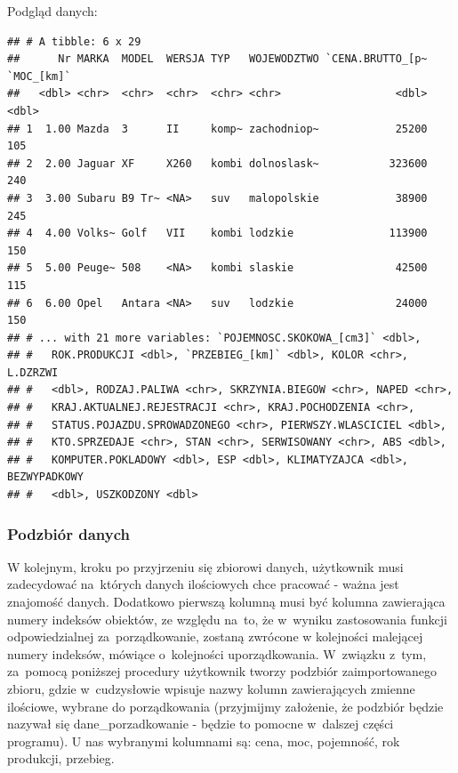 \documentclass[12pt,a4paper]{report}
\begin{document}
{Podgląd danych:

\begin{Shaded}
\begin{Highlighting}[]
\end{Highlighting}
\end{Shaded}

\begin{verbatim}
## # A tibble: 6 x 29
##      Nr MARKA  MODEL  WERSJA TYP   WOJEWODZTWO `CENA.BRUTTO_[p~ `MOC_[km]`
##   <dbl> <chr>  <chr>  <chr>  <chr> <chr>                  <dbl>      <dbl>
## 1  1.00 Mazda  3      II     komp~ zachodniop~            25200        105
## 2  2.00 Jaguar XF     X260   kombi dolnoslask~           323600        240
## 3  3.00 Subaru B9 Tr~ <NA>   suv   malopolskie            38900        245
## 4  4.00 Volks~ Golf   VII    kombi lodzkie               113900        150
## 5  5.00 Peuge~ 508    <NA>   kombi slaskie                42500        115
## 6  6.00 Opel   Antara <NA>   suv   lodzkie                24000        150
## # ... with 21 more variables: `POJEMNOSC.SKOKOWA_[cm3]` <dbl>,
## #   ROK.PRODUKCJI <dbl>, `PRZEBIEG_[km]` <dbl>, KOLOR <chr>, L.DZRZWI
## #   <dbl>, RODZAJ.PALIWA <chr>, SKRZYNIA.BIEGOW <chr>, NAPED <chr>,
## #   KRAJ.AKTUALNEJ.REJESTRACJI <chr>, KRAJ.POCHODZENIA <chr>,
## #   STATUS.POJAZDU.SPROWADZONEGO <chr>, PIERWSZY.WLASCICIEL <dbl>,
## #   KTO.SPRZEDAJE <chr>, STAN <chr>, SERWISOWANY <chr>, ABS <dbl>,
## #   KOMPUTER.POKLADOWY <dbl>, ESP <dbl>, KLIMATYZAJCA <dbl>, BEZWYPADKOWY
## #   <dbl>, USZKODZONY <dbl>
\end{verbatim}

\subsubsection{Podzbiór danych}

W kolejnym, kroku po przyjrzeniu się zbiorowi danych, użytkownik musi
zadecydować na~których danych ilościowych chce pracować - ważna jest
znajomość danych. Dodatkowo pierwszą kolumną musi być kolumna
zawierająca numery indeksów obiektów, ze względu na~to, że w~wyniku
zastosowania funkcji odpowiedzialnej za~porządkowanie, zostaną zwrócone
w kolejności malejącej numery indeksów, mówiące o~kolejności
uporządkowania. W~związku z~tym, za~pomocą poniższej procedury
użytkownik tworzy podzbiór zaimportowanego zbioru, gdzie w~cudzysłowie
wpisuje nazwy kolumn zawierających zmienne ilościowe, wybrane do
porządkowania (przyjmijmy założenie, że podzbiór będzie nazywał się
dane\_porzadkowanie - będzie to pomocne w~dalszej części programu). U
nas wybranymi kolumnami są: cena, moc, pojemność, rok produkcji,
przebieg.

}
\end{document}

